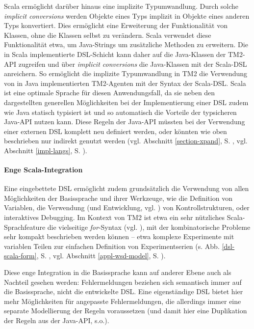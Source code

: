 \documentclass[abstracton, 12pt]{scrartcl}
\begin{document}
Scala ermöglicht darüber hinaus eine implizite Typumwandlung. Durch solche \emph{implicit conversions} werden Objekte eines Typs implizit in Objekte eines anderen Typs konvertiert. Dies ermöglicht eine Erweiterung der Funktionalität von Klassen, ohne die Klassen selbst zu verändern. Scala verwendet diese Funktionalität etwa, um Java-Strings um zusätzliche Methoden zu erweitern. Die in Scala implementierte DSL-Schicht kann daher auf die Java-Klassen der TM2-API zugreifen und über \emph{implicit conversions} die Java-Klassen mit der Scala-DSL anreichern. So ermöglicht die implizite Typumwandlung in TM2 die Verwendung von in Java implementierten TM2-Agenten mit der Syntax der Scala-DSL. Scala ist eine optimale Sprache für diesen Anwendungsfall, da sie neben den dargestellten generellen Möglichkeiten bei der Implementierung einer DSL zudem wie Java statisch typisiert ist und so automatisch die Vorteile der typsicheren Java-API nutzen kann. Diese Regeln der Java-API müssten bei der Verwendung einer externen DSL komplett neu definiert werden, oder könnten wie oben beschrieben nur indirekt genutzt werden (vgl. Abschnitt \ref{section-xpand}, S. \pageref{section-xpand}, vgl. Abschnitt \ref{impl-langs}, S. \pageref{impl-langs}).

\paragraph{Enge Scala-Integration}

Eine eingebettete DSL ermöglicht zudem grundsätzlich die Verwendung von allen Möglichkeiten der Basissprache und ihrer Werkzeuge, wie die Definition von Variablen, die Verwendung (und Entwicklung, vgl. \citealt[161ff.]{OderskyEtAl2008}) von Kontrollstrukturen, oder interaktives Debugging. Im Kontext von TM2 ist etwa ein sehr nützliches Scala-Sprachfeature die vielseitige \emph{for}-Syntax (vgl. \citealt[486]{OderskyEtAl2008}), mit der kombinatorische Probleme sehr kompakt beschrieben werden können -- etwa komplexe Experimente mit variablen Teilen zur einfachen Definition von Experimentserien (s. Abb. \ref{dsl-scala-form}, S. \pageref{dsl-scala-form}, vgl. Abschnitt \ref{appl-wsd-model}, S. \pageref{appl-wsd-model}).

Diese enge Integration in die Basissprache kann auf anderer Ebene auch als Nachteil gesehen werden: Fehlermeldungen beziehen sich semantisch immer auf die Basissprache, nicht die entwickelte DSL. Eine eigenständige DSL bietet hier mehr Möglichkeiten für angepasste Fehlermeldungen, die allerdings immer eine separate Modellierung der Regeln voraussetzen (und damit hier eine Duplikation der Regeln aus der Java-API, s.o.).
\end{document}
